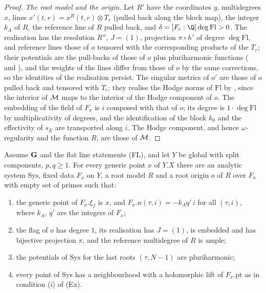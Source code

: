 \begin{proof}
\emph{The root model and the origin.} Let $R'$ have the coordinates $y$, multidegrees $x$, lines
$x'(t,r)=x^R(t,r)\otimes T_r$ (pulled back along the block map), the integer $k_A$ of $R$, the reference line of $R$
pulled back, and $\delta=[F_c:\Q]\deg\mathrm{Fl}>0$. The realisation has the resolution $R''$, $J=(1)$, projection
$\pi\circ h'$ of degree $\deg\mathrm{Fl}$, and reference lines those of $o$ tensored with the corresponding
products of the $T_r$; their potentials are the pull-backs of those of $o$ plus pluriharmonic functions
( and
), and the weights of the lines differ from those of $o$ by
the same corrections, so the identities of the realisation persist. The singular metrics of $o'$ are those of $o$
pulled back and tensored with $T_r$; they realise the Hodge norms of $\mathrm{Fl}$ by
, since the interior of $\mathcal M$ maps to the interior of the
Hodge component of $o$. The embedding of the field of $F_x$ is $i$ composed with that of $o$; its degree is
$1\cdot\deg\mathrm{Fl}$ by multiplicativity of degrees, and the identification of the block $k_0$ and the
effectivity of $s_E$ are transported along $i$. The Hodge component, and hence $\omega$-regularity and the function
$R$, are those of $\mathcal M$.
\end{proof}

\begin{lemma}\label{pf:towergeo:comp-data}
Assume $\mathbf G$ and the flat line statements \textup{(FL)}, and let $Y$ be global with split
components, $p,q\ge1$. For every generic point $x$ of $Y.X$ there are an analytic system $\mathrm{Sys}$,
fixed data $F_x$ on $Y$, a root model $R$ and a root origin $o$ of $R$ over $F_x$ with empty set of primes
such that:
\begin{enumerate}[label=(\alph*)]
\item the generic point of $F_x.\xi_f$ is $x$, and $F_x.n(\tau,i)=-k_Aq'\,i$ for all $(\tau,i)$, where
  $k_A$, $q'$ are the integers of $F_x$;
\item the flag of $o$ has degree $1$, its realisation has $J=(1)$, is embedded and has bijective
  projection $\pi$, and the reference multidegree of $R$ is ample;
\item the potentials of $\mathrm{Sys}$ for the last roots $(\tau,N-1)$ are pluriharmonic;
\item every point of $\mathrm{Sys}$ has a neighbourhood with a holomorphic lift of $F_x.\mathrm{pt}$ as in
  condition (i) of (Ex).
\end{enumerate}
\end{lemma}

